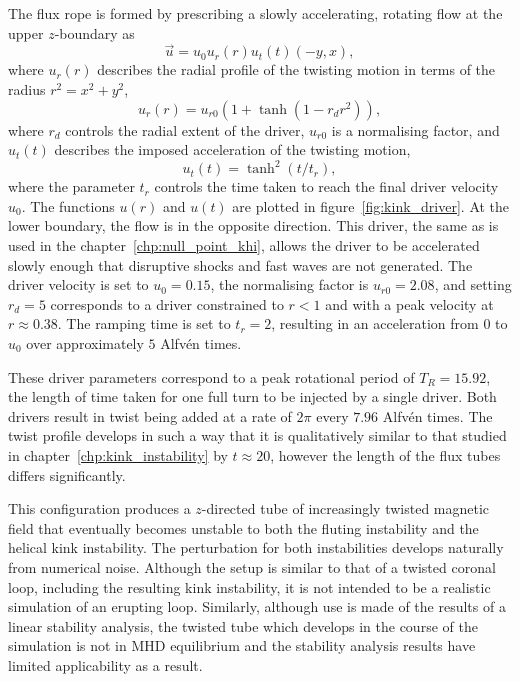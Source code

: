 The flux rope is formed by prescribing a slowly accelerating, rotating flow at the upper $z$-boundary as
\begin{equation}
  \label{eq:null_twisting_profile}
  \vec{u} = u_0 u_r(r) u_t(t) (-y, x),
\end{equation}
where $u_r(r)$ describes the radial profile of the twisting motion in terms of the radius $r^2 = x^2 + y^2$,
\begin{equation}
  \label{eq:radial_twisting_function}
  u_r(r) = u_{r0}(1 + \tanh(1 - r_d r^2)),
\end{equation}
where $r_d$ controls the radial extent of the driver, $u_{r0}$ is a normalising factor, and $u_t(t)$ describes the imposed acceleration of the twisting motion,
\begin{equation}
  \label{eq:ramping_up_function}
  u_t(t) = \tanh^2(t/t_r),
\end{equation}
where the parameter $t_r$ controls the time taken to reach the final driver velocity $u_0$. The functions $u(r)$ and $u(t)$ are plotted in figure~\ref{fig:kink_driver}. At the lower boundary, the flow is in the opposite direction. This driver, the same as is used in the chapter~\ref{chp:null_point_khi}, allows the driver to be accelerated slowly enough that disruptive shocks and fast waves are not generated. The driver velocity is set to $u_0 = 0.15$, the normalising factor is $u_{r0} = 2.08$, and setting $r_d = 5$ corresponds to a driver constrained to $r<1$ and with a peak velocity at $r\approx 0.38$. The ramping time is set to $t_r = 2$, resulting in an acceleration from $0$ to $u_0$ over approximately $5$ Alfv\'en times. 

These driver parameters correspond to a peak rotational period of $T_R = 15.92$, the length of time taken for one full turn to be injected by a single driver. Both drivers result in twist being added at a rate of $2\pi$ every $7.96$ Alfv\'en times. The twist profile develops in such a way that it is qualitatively similar to that studied in chapter~\ref{chp:kink_instability} by $t\approx 20$, however the length of the flux tubes differs significantly. 

This configuration produces a $z$-directed tube of increasingly twisted magnetic field that eventually becomes unstable to both the fluting instability and the helical kink instability. The perturbation for both instabilities develops naturally from numerical noise. Although the setup is similar to that of a twisted coronal loop, including the resulting kink instability, it is not intended to be a realistic simulation of an erupting loop. Similarly, although use is made of the results of a linear stability analysis, the twisted tube which develops in the course of the simulation is not in MHD equilibrium and the stability analysis results have limited applicability as a result.

